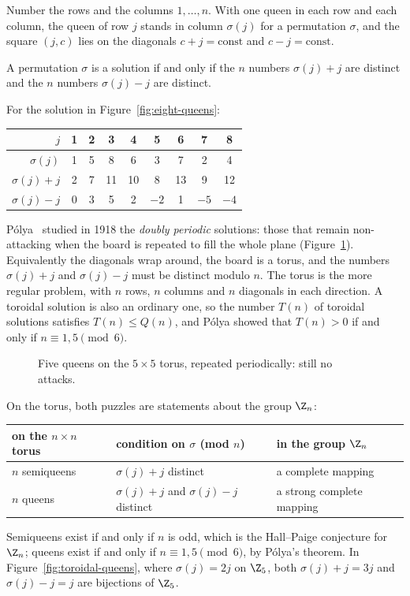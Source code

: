 Number the rows and the columns $1,\dots,n$. With one queen in each row and each column, the queen of row $j$ stands in column $\sigma(j)$ for a permutation $\sigma$, and the square $(j,c)$ lies on the diagonals $c+j=\text{const}$ and $c-j=\text{const}$.

\begin{fact}\label{fact:queens}
A permutation $\sigma$ is a solution if and only if the $n$ numbers $\sigma(j)+j$ are distinct and the $n$ numbers $\sigma(j)-j$ are distinct.
\end{fact}

For the solution in Figure~\ref{fig:eight-queens}:
\begin{center}
\renewcommand{\arraystretch}{1.2}
\begin{tabular}{r|cccccccc}
$j$ & 1&2&3&4&5&6&7&8\\\hline
$\sigma(j)$ & 1&5&8&6&3&7&2&4\\
$\sigma(j)+j$ & 2&7&11&10&8&13&9&12\\
$\sigma(j)-j$ & 0&3&5&2&$-2$&1&$-5$&$-4$
\end{tabular}
\end{center}


P\'olya~\cite{pol1918} studied in 1918 the \emph{doubly periodic} solutions: those that remain non-attacking when the board is repeated to fill the whole plane (Figure~\ref{fig:queens-tiled}). Equivalently the diagonals wrap around, the board is a torus, and the numbers $\sigma(j)+j$ and $\sigma(j)-j$ must be distinct modulo $n$. The torus is the more regular problem, with $n$ rows, $n$ columns and $n$ diagonals in each direction. A toroidal solution is also an ordinary one, so the number $T(n)$ of toroidal solutions satisfies $T(n)\leq Q(n)$, and P\'olya showed that $T(n)>0$ if and only if $n\equiv1,5\pmod6$.

\begin{figure}[ht]
\centering

\caption{Five queens on the $5\times5$ torus, repeated periodically: still no attacks.}
\label{fig:queens-tiled}
\end{figure}

On the torus, both puzzles are statements about the group $\Z_n$:
\begin{center}
\renewcommand{\arraystretch}{1.4}
\begin{tabular}{lll}
\textbf{on the $n\times n$ torus} & \textbf{condition on $\sigma$ (mod $n$)} & \textbf{in the group $\Z_n$}\\\hline
$n$ semiqueens & $\sigma(j)+j$ distinct & a complete mapping\\
$n$ queens & $\sigma(j)+j$ and $\sigma(j)-j$ distinct & a strong complete mapping
\end{tabular}
\end{center}
Semiqueens exist if and only if $n$ is odd, which is the Hall--Paige conjecture for $\Z_n$; queens exist if and only if $n\equiv1,5\pmod6$, by P\'olya's theorem. In Figure~\ref{fig:toroidal-queens}, where $\sigma(j)=2j$ on $\Z_5$, both $\sigma(j)+j=3j$ and $\sigma(j)-j=j$ are bijections of $\Z_5$.

